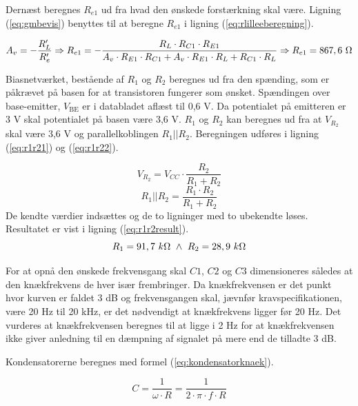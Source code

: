 Dernæst beregnes $R_{e1}$ ud fra hvad den ønskede forstærkning skal være. Ligning (\ref{eq:gmbevis}) benyttes til at beregne $R_{e1}$ i ligning (\ref{eq:rlilleeberegning}).

\begin{equation}
\label{eq:rlilleeberegning}
A_v = -\frac{R'_L}{R'_e} \Rightarrow  R_{e1} =-\frac{R_L \cdot R_{C1} \cdot R_{E1}}{A_v \cdot R_{E1} \cdot R_{C1} + A_v \cdot R_{E1} \cdot R_L + R_{C1} \cdot R_L} \Rightarrow R_{e1} = 867,6~\ohm
\end{equation}

Biasnetværket, bestående af $R_1$ og $R_2$ beregnes ud fra den spænding, som er påkrævet på basen for at transistoren fungerer som ønsket. Spændingen over base-emitter, $V_{\mathrm{BE}}$ er i databladet aflæst til 0,6 V. Da potentialet på emitteren er 3 V skal potentialet på basen være 3,6 V. $R_1$ og $R_2$ kan beregnes ud fra at $V_{R_2}$ skal være 3,6 V og parallelkoblingen $R_1||R_2$. Beregningen udføres i ligning (\ref{eq:r1r21}) og (\ref{eq:r1r22}).

\begin{equation}
V_{R_2} = V_{CC} \cdot \frac{R_2}{R_1+R_2} 
\label{eq:r1r21}
\end{equation}
\begin{equation}
R_1||R_2 = \frac{R_1 \cdot R_2}{R_1 + R_2}
\label{eq:r1r22}
\end{equation}
De kendte værdier indsættes og de to ligninger med to ubekendte løses. Resultatet er vist i ligning (\ref{eq:r1r2result}).
\begin{equation}
R_1 = 91,7~k\ohm ~ \wedge ~ R_2=28,9~k\ohm
\label{eq:r1r2result}
\end{equation}

For at opnå den ønskede frekvensgang skal $C1$, $C2$ og $C3$ dimensioneres således at den knækfrekvens de hver især frembringer. Da knækfrekvensen er det punkt hvor kurven er faldet 3 dB og frekvensgangen skal, jævnfør kravspecifikationen, være 20 Hz til 20 kHz, er det nødvendigt at knækfrekvens  ligger før 20 Hz. Det vurderes at knækfrekvensen beregnes til at ligge i 2 Hz for at knækfrekvensen ikke giver anledning til en dæmpning af signalet på mere end de tilladte 3 dB.

Kondensatorerne beregnes med formel (\ref{eq:kondensatorknaek}).

\begin{equation}
C=\frac{1}{\omega \cdot R}=\frac{1}{2\cdot \pi \cdot f \cdot R}
\label{eq:kondensatorknaek}
\end{equation}

